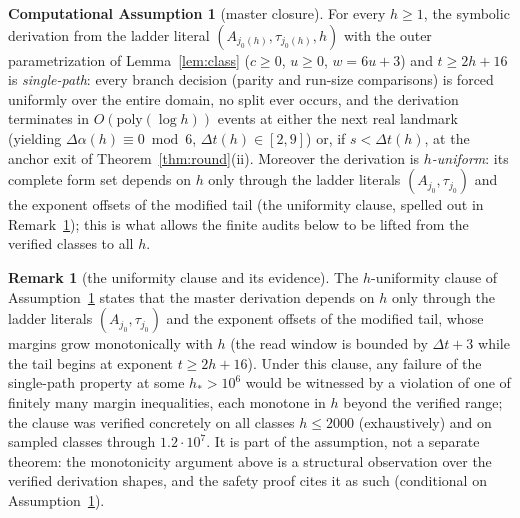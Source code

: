 \documentclass[11pt]{amsart}
\theoremstyle{definition}
\newtheorem{remark}[theorem]{Remark}
\newtheorem{assumption}[theorem]{Computational Assumption}
\begin{document}
\begin{assumption}[master closure]\label{ass:master}
For every $h\ge1$, the symbolic derivation from the ladder literal
$(A_{j_0(h)},\tau_{j_0(h)},h)$ with the outer parametrization of
Lemma~\ref{lem:class} ($c\ge0$, $u\ge0$, $w=6u+3$) and $t\ge2h+16$ is
\emph{single-path}: every branch decision (parity and run-size comparisons)
is forced uniformly over the entire domain, no split ever occurs, and the
derivation terminates in $O(\mathrm{poly}(\log h))$ events at either the
next real landmark (yielding $\Delta\alpha(h)\equiv0\bmod6$,
$\Delta t(h)\in[2,9]$) or, if $s<\Delta t(h)$, at the anchor exit of
Theorem~\ref{thm:round}(ii). Moreover the derivation is \emph{$h$-uniform}:
its complete form set depends on $h$ only through the ladder literals
$(A_{j_0},\tau_{j_0})$ and the exponent offsets of the modified tail
(the uniformity clause, spelled out in Remark~\ref{rem:uniform}); this is
what allows the finite audits below to be lifted from the verified
classes to all $h$.
\end{assumption}

\begin{remark}[the uniformity clause and its evidence]\label{rem:uniform}
The $h$-uniformity clause of Assumption~\ref{ass:master} states that the
master derivation depends on $h$ only through the ladder literals
$(A_{j_0},\tau_{j_0})$ and the exponent offsets of the modified tail,
whose margins grow monotonically with $h$ (the read window is bounded by
$\Delta t+3$ while the tail begins at exponent $t\ge2h+16$). Under this
clause, any failure of the single-path property at some $h_\ast>10^{6}$
would be witnessed by a violation of one of finitely many margin
inequalities, each monotone in $h$ beyond the verified range; the clause
was verified concretely on all classes $h\le2000$ (exhaustively) and on
sampled classes through $1.2\cdot10^{7}$. It is part of the assumption,
not a separate theorem: the monotonicity argument above is a structural
observation over the verified derivation shapes, and the safety proof
cites it as such (conditional on Assumption~\ref{ass:master}).
\end{remark}
\end{document}
